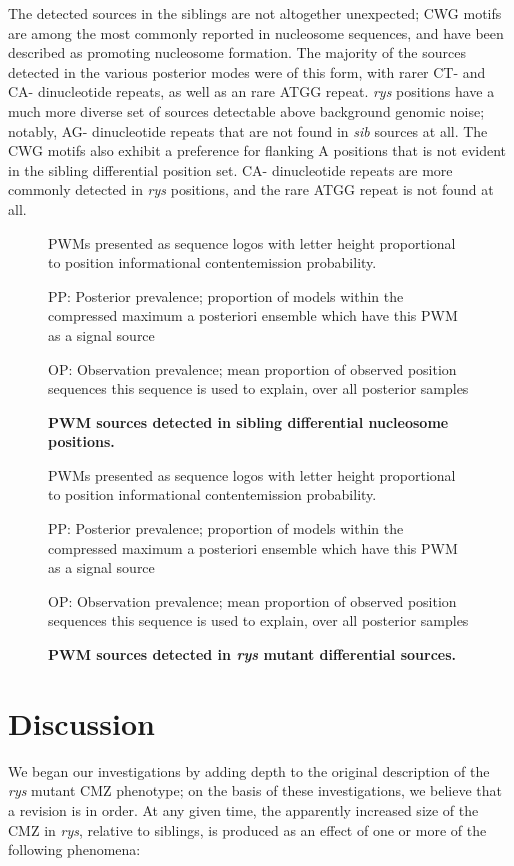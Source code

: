The detected sources in the siblings are not altogether unexpected; CWG motifs are among the most commonly reported in nucleosome sequences, and have been described as promoting nucleosome formation. The majority of the sources detected in the various posterior modes were of this form, with rarer CT- and CA- dinucleotide repeats, as well as an rare ATGG repeat. \textit{rys} positions have a much more diverse set of sources detectable above background genomic noise; notably, AG- dinucleotide repeats that are not found in \textit{sib} sources at all. The CWG motifs also exhibit a preference for flanking A positions that is not evident in the sibling differential position set. CA- dinucleotide repeats are more commonly detected in \textit{rys} positions, and the rare ATGG repeat is not found at all.

\begin{figure}[!h]
    \caption{{\bf PWM sources detected in sibling differential nucleosome positions.}}
    PWMs presented as sequence logos with letter height proportional to position informational content\/emission probability.
    
    PP: Posterior prevalence; proportion of models within the compressed maximum a posteriori ensemble which have this PWM as a signal source

    OP: Observation prevalence; mean proportion of observed position sequences this sequence is used to explain, over all posterior samples
    \label{sibmotifs}
\end{figure}

\begin{figure}[!h]
    \caption{{\bf PWM sources detected in \textit{rys} mutant differential sources.}}
    PWMs presented as sequence logos with letter height proportional to position informational content\/emission probability.
    
    PP: Posterior prevalence; proportion of models within the compressed maximum a posteriori ensemble which have this PWM as a signal source

    OP: Observation prevalence; mean proportion of observed position sequences this sequence is used to explain, over all posterior samples
    \label{rysmotifs}
\end{figure}

\FloatBarrier

\section{Discussion}
We began our investigations by adding depth to the original description of the \textit{rys} mutant CMZ phenotype; on the basis of these investigations, we believe that a revision is in order. At any given time, the apparently increased size of the CMZ in \textit{rys}, relative to siblings, is produced as an effect of one or more of the following phenomena:

